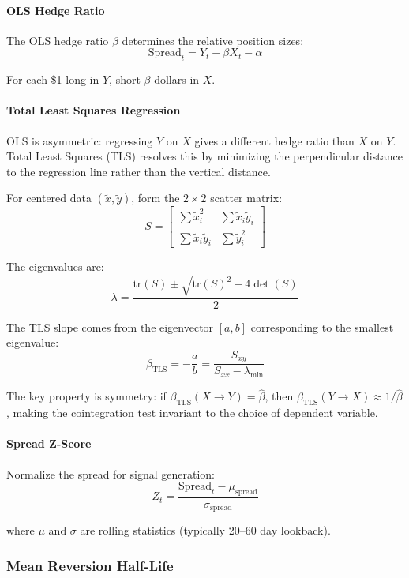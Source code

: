 \paragraph{OLS Hedge Ratio}

The OLS hedge ratio $\beta$ determines the relative position sizes:
\[
\text{Spread}_t = Y_t - \beta X_t - \alpha
\]

For each \$1 long in $Y$, short $\beta$ dollars in $X$.

\paragraph{Total Least Squares Regression}

OLS is asymmetric: regressing $Y$ on $X$ gives a different hedge ratio than $X$ on $Y$. Total Least Squares (TLS) resolves this by minimizing the perpendicular distance to the regression line rather than the vertical distance.

For centered data $(\tilde{x}, \tilde{y})$, form the $2 \times 2$ scatter matrix:
\[
S = \begin{bmatrix} \sum \tilde{x}_i^2 & \sum \tilde{x}_i \tilde{y}_i \\ \sum \tilde{x}_i \tilde{y}_i & \sum \tilde{y}_i^2 \end{bmatrix}
\]

The eigenvalues are:
\[
\lambda = \frac{\text{tr}(S) \pm \sqrt{\text{tr}(S)^2 - 4 \det(S)}}{2}
\]

The TLS slope comes from the eigenvector $[a, b]$ corresponding to the smallest eigenvalue:
\[
\beta_{\text{TLS}} = -\frac{a}{b} = \frac{S_{xy}}{S_{xx} - \lambda_{\min}}
\]

The key property is symmetry: if $\beta_{\text{TLS}}(X \to Y) = \hat{\beta}$, then $\beta_{\text{TLS}}(Y \to X) \approx 1/\hat{\beta}$, making the cointegration test invariant to the choice of dependent variable.

\paragraph{Spread Z-Score}

Normalize the spread for signal generation:
\[
Z_t = \frac{\text{Spread}_t - \mu_{\text{spread}}}{\sigma_{\text{spread}}}
\]

where $\mu$ and $\sigma$ are rolling statistics (typically 20--60 day lookback).

\subsubsection{Mean Reversion Half-Life}

